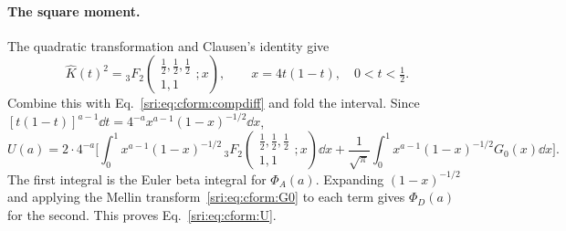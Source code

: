 \paragraph{The square moment.} The quadratic transformation and Clausen's identity give
\begin{equation}
 \hat K(t)^2={}_3F_2\!\left(\begin{matrix}\frac12,\frac12,\frac12\\1,1\end{matrix};x\right),\qquad x=4t(1-t),\quad0<t<\tfrac12.
\end{equation}
Combine this with Eq.~\eqref{sri:eq:cform:compdiff} and fold the interval. Since
$[t(1-t)]^{a-1}\dd t=4^{-a}x^{a-1}(1-x)^{-1/2}\dd x$,
\begin{equation}
 U(a)=2\cdot4^{-a}\biggl[\int_0^1x^{a-1}(1-x)^{-1/2}\,{}_3F_2\!\left(\begin{matrix}\frac12,\frac12,\frac12\\1,1\end{matrix};x\right)\dd x
 +\frac1{\sqrt\pi}\int_0^1x^{a-1}(1-x)^{-1/2}G_0(x)\dd x\biggr].
\end{equation}
The first integral is the Euler beta integral for $\Phi_A(a)$. Expanding $(1-x)^{-1/2}$ and applying the Mellin
transform~\eqref{sri:eq:cform:G0} to each term gives $\Phi_D(a)$ for the second. This proves Eq.~\eqref{sri:eq:cform:U}.

